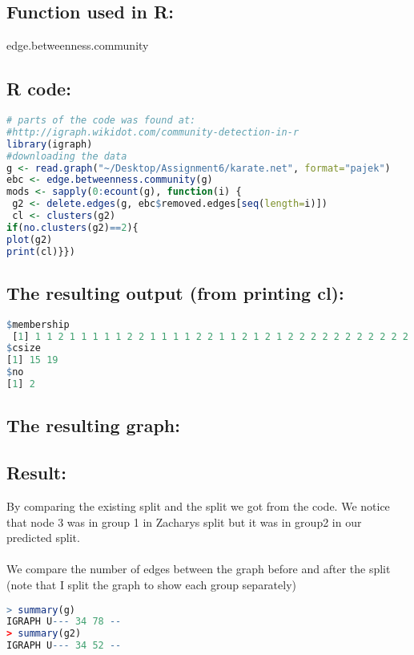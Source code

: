 \documentclass[letterpaper,11pt]{article}
\begin{document}
\subsection*{Function used in R:}
edge.betweenness.community

\subsection*{R code:}

\begin{lstlisting}[language=R,frame=single]
# parts of the code was found at:
#http://igraph.wikidot.com/community-detection-in-r
library(igraph)
#downloading the data
g <- read.graph("~/Desktop/Assignment6/karate.net", format="pajek")
ebc <- edge.betweenness.community(g)
mods <- sapply(0:ecount(g), function(i) {
 g2 <- delete.edges(g, ebc$removed.edges[seq(length=i)])
 cl <- clusters(g2)
if(no.clusters(g2)==2){
plot(g2)
print(cl)}})
\end{lstlisting}
\newpage
\subsection*{The resulting output (from printing cl):}
\begin{lstlisting}[language=R,frame=single]
$membership
 [1] 1 1 2 1 1 1 1 1 2 2 1 1 1 1 2 2 1 1 2 1 2 1 2 2 2 2 2 2 2 2 2 2 2 2
$csize
[1] 15 19
$no
[1] 2
\end{lstlisting}

\subsection*{The resulting graph:}
\noindent
\begin{minipage}{\linewidth}
\label{visina8}
\end{minipage}

\subsection*{Result:}
By comparing the existing split and the split we got from the code. We notice that node 3 was in group 1 in Zacharys split but it was in group2 in our predicted split.\\
\\
We compare the number of edges between the graph before and after the split (note that I split the graph to show each group separately)\\
\newpage
\begin{lstlisting}[language=R,frame=single]
> summary(g)
IGRAPH U--- 34 78 -- 
> summary(g2)
IGRAPH U--- 34 52 --
\end{lstlisting}
\end{document}
